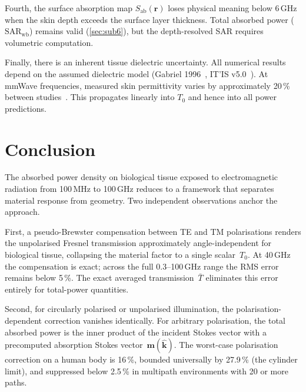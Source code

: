 \documentclass[11pt,a4paper]{article}
\theoremstyle{definition}      %
\newcommand{\khat}{\hat{\bm{k}}}
\newcommand{\rr}{\mathbf{r}}
\newcommand{\Sab}{S_{\mathrm{ab}}}
\newcommand{\SARwb}{\mathrm{SAR}_{\mathrm{wb}}}
\newcommand{\Tbar}{\bar{T}}
\begin{document}
Fourth, the surface absorption map $\Sab(\rr)$ loses physical meaning below 6\,GHz
when the skin depth exceeds the surface layer thickness.
Total absorbed power ($\SARwb$) remains valid
(\cref{sec:sub6}), but the depth-resolved SAR requires
volumetric computation.

Finally, there is an inherent tissue dielectric uncertainty.
All numerical results depend on the assumed dielectric model
(Gabriel 1996~\cite{Gabriel1996}, IT'IS v5.0~\cite{ITISv5}).  At
mmWave frequencies, measured skin permittivity varies by
approximately 20\,\% between
studies~\cite{AlekseevZiskin2007,Zhadobov2011}.
This propagates linearly into $T_0$ and hence into all power
predictions.


\section{Conclusion}\label{sec:conclusion}

The absorbed power density on biological tissue exposed to
electromagnetic radiation from 100\,MHz to 100\,GHz reduces to a
framework that separates material response from geometry.  Two
independent observations anchor the approach.

First, a pseudo-Brewster compensation between TE and TM
polarisations renders the unpolarised Fresnel transmission
approximately angle-independent for biological tissue, collapsing
the material factor to a single scalar~$T_0$.  At 40\,GHz the
compensation is exact; across the full 0.3--100\,GHz range the
RMS error remains below 5\,\%.  The exact averaged
transmission~$\Tbar$ eliminates this error entirely for
total-power quantities.

Second, for circularly polarised or unpolarised illumination, the
polarisation-dependent correction vanishes identically.  For
arbitrary polarisation, the total absorbed power is the inner product
of the incident Stokes vector with a precomputed absorption Stokes
vector~$\mathbf{m}(\khat)$.  The worst-case polarisation correction
on a human body is 16\,\%, bounded universally by 27.9\,\% (the
cylinder limit), and suppressed below 2.5\,\% in multipath
environments with 20 or more paths.
\end{document}
